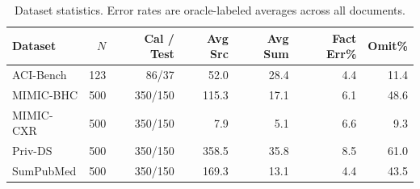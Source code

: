 \begin{table}[t]
\centering
\small
\caption{Dataset statistics. Error rates are oracle-labeled averages across all documents.}
\label{tab:dataset-stats}
\begin{tabular}{lrrrrrr}
\toprule
Dataset & $N$ & Cal / Test & Avg Src & Avg Sum & Fact Err\% & Omit\% \\
\midrule
ACI-Bench & 123 & 86/37 & 52.0 & 28.4 & 4.4 & 11.4 \\
MIMIC-BHC & 500 & 350/150 & 115.3 & 17.1 & 6.1 & 48.6 \\
MIMIC-CXR & 500 & 350/150 & 7.9 & 5.1 & 6.6 & 9.3 \\
Priv-DS & 500 & 350/150 & 358.5 & 35.8 & 8.5 & 61.0 \\
SumPubMed & 500 & 350/150 & 169.3 & 13.1 & 4.4 & 43.5 \\
\bottomrule
\end{tabular}
\end{table}